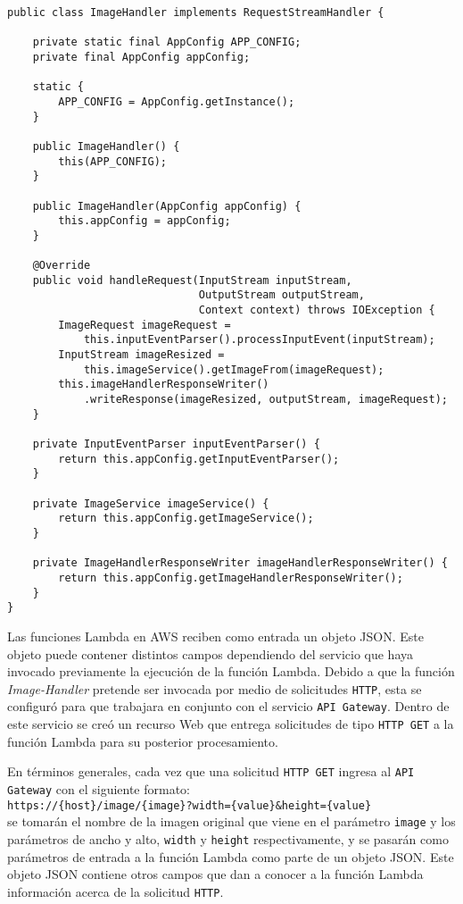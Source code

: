 \renewcommand\lstlistingname{Listado}
\begin{lstlisting}[linewidth=16.5cm, caption={Clase \texttt{ImageHandler.java}}, label={lst:lambda-1}]
public class ImageHandler implements RequestStreamHandler {

    private static final AppConfig APP_CONFIG;
    private final AppConfig appConfig;

    static {
        APP_CONFIG = AppConfig.getInstance();
    }

    public ImageHandler() {
        this(APP_CONFIG);
    }

    public ImageHandler(AppConfig appConfig) {
        this.appConfig = appConfig;
    }

    @Override
    public void handleRequest(InputStream inputStream, 
                              OutputStream outputStream, 
                              Context context) throws IOException {
        ImageRequest imageRequest = 
            this.inputEventParser().processInputEvent(inputStream);
        InputStream imageResized = 
            this.imageService().getImageFrom(imageRequest);
        this.imageHandlerResponseWriter()
            .writeResponse(imageResized, outputStream, imageRequest);
    }

    private InputEventParser inputEventParser() {
        return this.appConfig.getInputEventParser();
    }

    private ImageService imageService() {
        return this.appConfig.getImageService();
    }

    private ImageHandlerResponseWriter imageHandlerResponseWriter() {
        return this.appConfig.getImageHandlerResponseWriter();
    }
}    
\end{lstlisting}


Las funciones Lambda en AWS reciben como entrada un objeto JSON. Este objeto puede contener distintos campos dependiendo del servicio que haya invocado previamente la ejecución de la función Lambda. Debido a que la función \emph{Image-Handler} pretende ser invocada por medio de solicitudes \texttt{HTTP}, esta se configuró para que trabajara en conjunto con el servicio \texttt{API Gateway}. Dentro de este servicio se creó un recurso Web que entrega solicitudes de tipo \texttt{HTTP GET} a la función Lambda para su posterior procesamiento.

En términos generales, cada vez que una solicitud \texttt{HTTP GET} ingresa al \texttt{API Gateway} con el siguiente formato:\\ \texttt{https://\{host\}/image/\{image\}?width=\{value\}\&height=\{value\}}\\ se tomarán el nombre de la imagen original que viene en el parámetro \texttt{image} y los parámetros de ancho y alto, \texttt{width} y \texttt{height} respectivamente, y se pasarán como parámetros de entrada a la función Lambda como parte de un objeto JSON. Este objeto JSON contiene otros campos que dan a conocer a la función Lambda información acerca de la solicitud \texttt{HTTP}.

